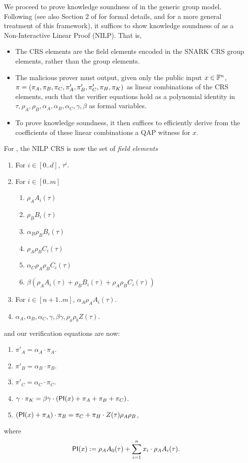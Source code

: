 \documentclass[11pt]{article}
\numberwithin{figure}{section} %
\begin{document}
We proceed to prove knowledge soundness of \bctvprime in the generic group model.
Following \cite{groth16} (see also Section 2 of \cite{BG18} for formal details, and \cite{BCIOP} for a more general treatment of this framework), it suffices to show knowledge soundness of \bctvprime as a Non-Interactive Linear Proof (NILP). That is, 
\begin{itemize}
\item The CRS elements are the field elements encoded in the SNARK CRS group elements, rather than the group elements.
\item The malicious prover must output, given only the public input $x\in\mathbb F^n$, $\pi = (\pi_A,\pi_B,\pi_C,\pi'_A,\pi'_B,\pi'_C,\pi_H,\pi_K)$ as linear combinations of the CRS elements, such that the verifier equations hold as a polynomial identity in 
$\tau,\rho_A,\rho_B,\alpha_A,\alpha_B,\alpha_C,\gamma,\beta$ as formal variables.
\item To prove knowledge soundness, it then suffices to efficiently derive from the coefficients of these linear combinations a QAP witness for $x$.
\end{itemize}

For \bctvprime, the NILP CRS is now the set of \emph{field elements}

\begin{enumerate}
 \item For $i\in [0..d]$, $\tau^i$.
 \item For $i\in [0..m]$ 
 
 \begin{enumerate}
  \item $\rho_A A_i(\tau)$
\item $\rho_B B_i(\tau)$
\item $\alpha_B\rho_B B_i(\tau)$
\item $\rho_A\rho_B C_i(\tau)$
\item $\alpha_C \rho_A\rho_B C_i(\tau)$ 
\item $\beta(\rho_A A_i(\tau) + \rho_B B_i(\tau) + \rho_A\rho_B C_i(\tau))$ 
\end{enumerate}
\item For $i\in [n+1..m]$, $\alpha_A\rho_A A_i(\tau)$.

\item $\alpha_A,\alpha_B,\alpha_C,\gamma,\beta\gamma,\rho_a\rho_b Z(\tau)$.
\end{enumerate}

and our verification equations are now:
\begin{enumerate}
 \item $\pi'_A= \alpha_A\cdot \pi_A$.
\item $\pi'_B=\alpha_B\cdot \pi_B$.
\item $\pi'_C=\alpha_C\cdot \pi_C$.
\item $\gamma\cdot \pi_K =\beta\gamma\cdot (\mathsf{PI}(x)+\pi_A+\pi_B+\pi_C)$.
\item $(\mathsf{PI}(x)+\pi_A)\cdot \pi_B= \pi_C + \pi_H\cdot Z(\tau)\rho_A\rho_B$,
 \end{enumerate}
where
\[\mathsf{PI}(x):= \rho_A A_0(\tau) + \sum_{i=1}^n x_i\cdot \rho_A A_i(\tau) .\]
 
\end{document}

